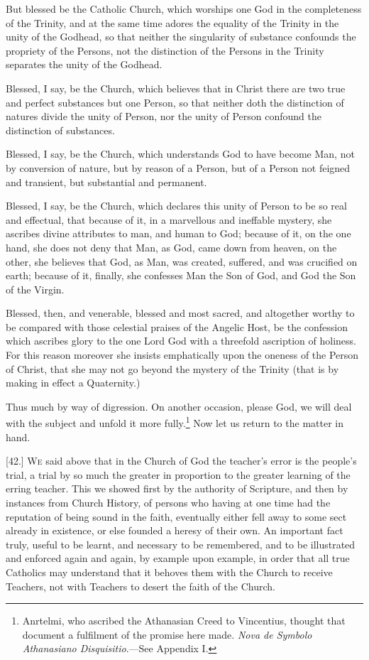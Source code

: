 But blessed be the Catholic Church, which worships one God in the completeness of the Trinity, and at the same time adores the equality of the Trinity in the unity of the Godhead, so that neither the singularity of substance confounds the propriety of the Persons, not the distinction of the Persons in the Trinity separates the unity of the Godhead.

Blessed, I say, be the Church, which believes that in Christ there are two true and perfect substances but one Person, so that neither doth the distinction of natures divide the unity of Person, nor the unity of Person confound the distinction of substances.

Blessed, I say, be the Church, which understands God to have become Man, not by conversion of nature, but by reason of a Person, but of a Person not feigned and transient, but substantial and permanent.

Blessed, I say, be the Church, which declares this unity of Person to be so real and effectual, that because of it, in a marvellous and ineffable mystery, she ascribes divine attributes to man, and human to God; because of it, on the one hand, she does not deny that Man, as God, came down from heaven, on the other, she believes that God, as Man, was created, suffered, and was crucified on earth; because of it, finally, she confesses Man the Son of God, and God the Son of the Virgin.

Blessed, then, and venerable, blessed and most sacred, and altogether worthy to be compared with those celestial praises of the Angelic Host, be the confession which ascribes glory to the one Lord God with a threefold ascription of holiness. For this reason moreover she insists emphatically upon the oneness of the Person of Christ, that she may not go beyond the mystery of the Trinity (that is by making in effect a Quaternity.)

Thus much by way of digression. On another occasion, please God, we will deal with the subject and unfold it more fully.\footnote{Anrtelmi, who ascribed the Athanasian Creed to Vincentius, thought that document a fulfilment of the promise here made. \emph{Nova de Symbolo Athanasiano Disquisitio}.—See Appendix I.} Now let us return to the matter in hand.


[42.] \textsc{We} said above that in the Church of God the teacher’s error is the people’s trial, a trial by so much the greater in proportion to the greater learning of the erring teacher. This we showed first by the authority of Scripture, and then by instances from Church History, of persons who having at one time had the reputation of being sound in the faith, eventually either fell away to some sect already in existence, or else founded a heresy of their own. An important fact truly, useful to be learnt, and necessary to be remembered, and to be illustrated and enforced again and again, by example upon example, in order that all true Catholics may understand that it behoves them with the Church to receive Teachers, not with Teachers to desert the faith of the Church.

